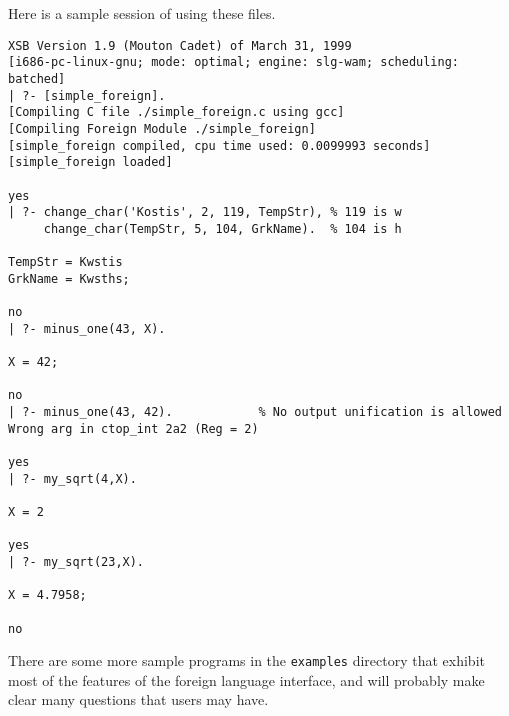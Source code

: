 Here is a sample session of using these files.
\begin{small}
\begin{verbatim}
XSB Version 1.9 (Mouton Cadet) of March 31, 1999
[i686-pc-linux-gnu; mode: optimal; engine: slg-wam; scheduling: batched]
| ?- [simple_foreign].
[Compiling C file ./simple_foreign.c using gcc]
[Compiling Foreign Module ./simple_foreign]
[simple_foreign compiled, cpu time used: 0.0099993 seconds]
[simple_foreign loaded]

yes
| ?- change_char('Kostis', 2, 119, TempStr), % 119 is w
     change_char(TempStr, 5, 104, GrkName).  % 104 is h

TempStr = Kwstis
GrkName = Kwsths;

no
| ?- minus_one(43, X).

X = 42;

no
| ?- minus_one(43, 42).	           % No output unification is allowed
Wrong arg in ctop_int 2a2 (Reg = 2)

yes
| ?- my_sqrt(4,X). 

X = 2

yes
| ?- my_sqrt(23,X).

X = 4.7958;

no
\end{verbatim}
\end{small}

There are some more sample programs in the {\tt examples} directory that
exhibit most of the features of the foreign language interface, and
will probably make clear many questions that users may have.


